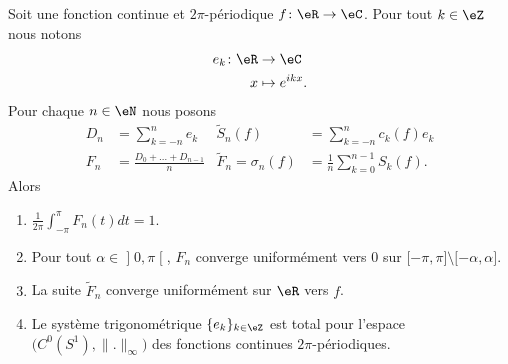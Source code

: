 \begin{theorem}[Fejèr]      \label{ThoJFqczow}
    Soit une fonction continue et \( 2\pi\)-périodique \( f\colon \eR\to \eC\). Pour tout \( k\in \eZ\) nous notons
    \begin{equation}
        \begin{aligned}
            e_k\colon \eR&\to \eC \\
            x&\mapsto  e^{ikx}. 
        \end{aligned}
    \end{equation}
    Pour chaque \( n\in \eN\) nous posons
    \begin{subequations}
        \begin{align}
            D_n&=\sum_{k=-n}^ne_k& \tilde S_n(f)&=\sum_{k=-n}^nc_k(f)e_k\\
            F_n&=\frac{  D_0+\ldots + D_{n-1} }{ n }&  \tilde F_n=\sigma_n(f)&=\frac{1}{ n }\sum_{k=0}^{n-1}S_k(f).
        \end{align}
    \end{subequations}
    Alors
    \begin{enumerate}
        \item
            $\frac{1}{ 2\pi }\int_{-\pi}^{\pi}F_n(t)dt=1$.
        \item
            Pour tout \( \alpha\in \mathopen] 0 , \pi \mathclose[\), \( F_n\) converge uniformément vers \( 0\) sur \( \mathopen[ -\pi , \pi \mathclose]\setminus\mathopen[ -\alpha , \alpha \mathclose]\).
        \item
            La suite \( \tilde F_n \) converge uniformément sur \( \eR\) vers \( f\).
        \item   \label{ItemUNQSPmyiv}
            Le système trigonométrique \( \{ e_k \}_{k\in\eZ}\) est total pour l'espace \( \big( C^0(S^1),\| . \|_{\infty} \big)\) des fonctions continues \( 2\pi\)-périodiques.
    \end{enumerate}
\end{theorem}

